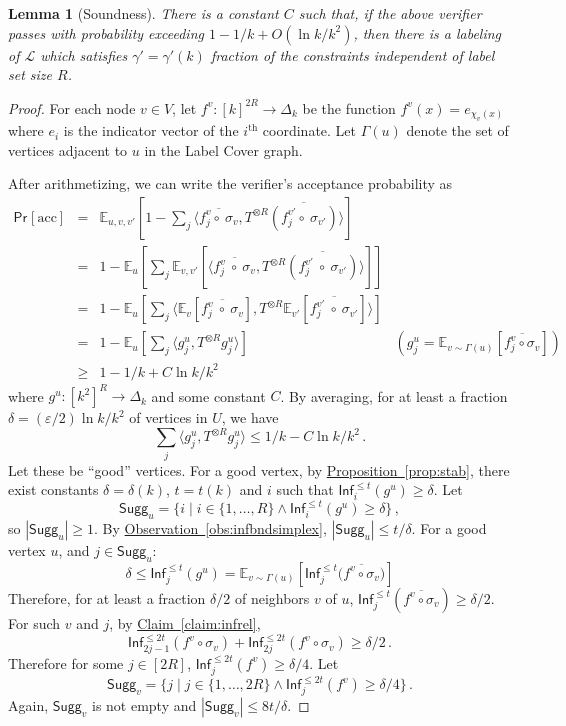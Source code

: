 \documentclass[10pt]{article}
\newtheorem{lemma}[theorem]{Lemma}
\theoremstyle{definition}
\numberwithin{equation}{section}
\newcommand{\expref}[2]{\texorpdfstring{\hyperref[#2]{#1~\ref{#2}}}{#1~\ref{#2}}}
\newcommand{\expct}[2]{\mathbb{E}_{#1}\left[#2\right]}
\newcommand{\prob}[2]{\mathsf{Pr}_{#1}\left[#2\right]}
\newcommand{\sugg}{\mathsf{Sugg}}
\newcommand{\intset}[1]{\ensuremath{\{1,\ldots,{#1}\}}}
\newcommand{\infl}{\ensuremath{\mathsf{Inf}}}
\newcommand{\eps}{\varepsilon}
\newcommand{\texsup}[2]{\ensuremath{\text{#1}^{\text{#2}}}}
\renewcommand{\ge}{\geqslant}
\renewcommand{\le}{\leqslant}
\begin{document}
%
\begin{lemma}[Soundness]
\label{lem:kcol-soundness}
  There is a constant $C$ such that, if the above verifier passes with
  probability exceeding $1-1/k+O(\ln k/k^2)$, then there
  is a labeling of $\mathcal{L}$ which satisfies $\gamma'=\gamma'(k)$
  fraction of the constraints independent of label set size $R$.
\end{lemma}
%
\begin{proof}
  For each node $v \in V$, let $f^v:[k]^{2 R} \rightarrow \Delta_k$ be
  the function $f^v(x) = e_{\chi_v(x)}$ where $e_i$
%
is the indicator
  vector of the \texsup{$i$}{th} coordinate. Let $\Gamma(u)$ denote
  the set of vertices adjacent to $u$ in the Label Cover graph.

  After arithmetizing, we can write the verifier's acceptance probability as
%
%
  \[
    \begin{array}{rclr}
      \prob{}{\text{acc}} &=&
      \expct{u,v,v'} {1-
        \sum_j \langle \overline{f^v_j \circ\ \sigma_v},
        T^{\otimes R} \overline{(f^{v'}_j \circ\ \sigma_{v'})}\rangle} \\
      &=& 1 - \expct{u}{\sum_j \expct{v,v'} {
          \langle \overline{f^v_j\ \circ\ \sigma_v},
          T^{\otimes R} \overline{(f^{v'}_j\ \circ\ \sigma_{v'})}\rangle}} \\
      &=& 1 - \expct{u} {\sum_j
        \langle \expct{v}{\overline{f^v_j\ \circ\ \sigma_v}},
        T^{\otimes R} \expct{v'}{
          \overline{f^{v'}_j\ \circ\ \sigma_{v'}}}\rangle} \\
      &=& 1 - \expct{u} {
        \sum_j\langle g^u_j, T^{\otimes R} g^u_j\rangle} & 
      \left(g^u_j = \expct{v\sim \Gamma(u)}
        {\overline{f^v_j\circ \sigma_v}}\right)\\
      &\ge& 1 - 1/k + C \ln k/k^2 
    \end{array}
    \] where $g^u:[k^2]^{R}\to \Delta_{k}$ and some constant $C$.
    By averaging, for at least a fraction $\delta=(\eps/2) \ln k/k^2$
    of vertices in $U$, we have
    \[
    \sum_j\langle g^u_j, T^{\otimes R} g^u_j\rangle \le 1/k-C \ln
    k/k^2\,.\]
    Let these be ``good'' vertices. For a good vertex, by \expref{Proposition}{prop:stab}, there exist constants $\delta=\delta(k)$,
    $t=t(k)$ and $i$ such that $\infl_i^{\le t}(g^u)\ge\delta$. Let
    \[\sugg_u = \{i\mid i\in \intset{R}\wedge \infl_{i}^{\le t} (g^u)\ge
    \delta\}\,,\] so $|\sugg_u|\ge 1$. By \expref{Observation}{obs:infbndsimplex}, $|\sugg_u|\le t/\delta$. For a good
    vertex $u$, and $j\in\sugg_u$:
    \[ \delta \le \infl_j^{\le t} (g^u) = \expct{v \sim
      \Gamma(u)}{\infl_{j}^{\le t} \bigl( \overline{f^v \circ \sigma_v} \bigr)} \] 
    Therefore, for at least a fraction $\delta/2$ of neighbors $v$ of
    $u$, $\infl^{\le t}_{j}(\overline{f^v \circ \sigma_v}) \ge
    \delta/2$.  For such $v$ and $j$, by \expref{Claim}{claim:infrel},
    \[
\infl_{2j-1}^{\le 2t} (f^v\circ \sigma_v) + \infl_{2j}^{\le 2t}
    (f^v\circ \sigma_v) \ge \delta/2\,.
\] Therefore for some $j\in[2 R]$,
    $\infl_j^{\le 2t} (f^v) \ge \delta/4$. Let \[\sugg_v = \{j\mid j\in
    \intset{2 R}\wedge \infl_{j}^{\le 2t} (f^v)\ge \delta/4\}\,.\] Again,
    $\sugg_v$ is not empty and $|\sugg_v|\le 8 t/\delta$.


\end{proof}
\end{document}
